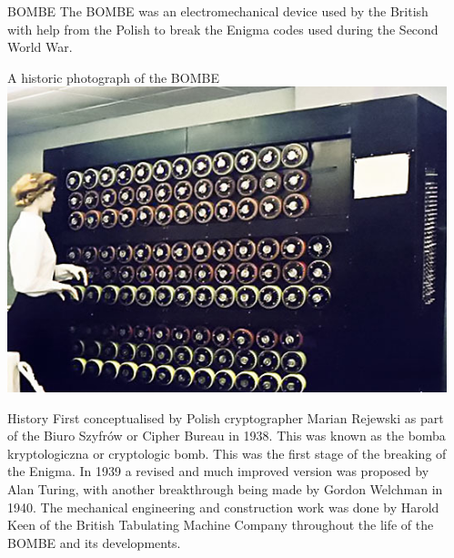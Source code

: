\documentclass[final]{beamer}
\begin{document}
\begin{frame}{}
\begin{columns}[t]
\begin{column}{.32\linewidth}
      \end{column}


      \begin{column}{.32\linewidth}
      \centering
       \begin{block}{BOMBE}
          The BOMBE was an electromechanical device used by the British with help from the Polish to break the Enigma codes used during the Second World War.
        \end{block}
        
        \begin{block}{A historic photograph of the BOMBE}
          \includegraphics[width=\columnwidth]{historicBOMBE.png} 
        \end{block}
        
        \begin{block}{History} \small{
		First conceptualised by Polish cryptographer Marian Rejewski as part of the Biuro Szyfr\'ow or Cipher Bureau in 1938. This was known as the bomba kryptologiczna or cryptologic bomb. This was the first stage of the breaking of the Enigma. In 1939 a revised and much improved version was proposed by Alan Turing, with another breakthrough being made by Gordon Welchman in 1940. The mechanical engineering and construction work was done by Harold Keen of the British Tabulating Machine Company throughout the life of the BOMBE and its developments.}
        \end{block}
        

\end{column}
\end{columns}
\end{frame}
\end{document}
